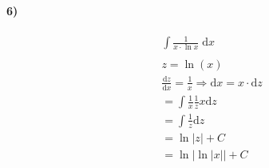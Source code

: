 \paragraph{6)}

\begin{align*}
    &\int \frac{1}{x \cdot \ln x} \;\mathrm{d}x \\
    \\
    &z = \ln (x) \\
    &\frac{\mathrm{d} z}{\mathrm{d} x} = \frac{1}{x} \Rightarrow \mathrm{d} x = x \cdot \mathrm{d} z \\
    &= \int \frac{1}{x} \frac{1}{z} x \mathrm{d}z \\
    &= \int \frac{1}{z} \mathrm{d} z \\
    &= \ln|z| + C \\
    &= \ln|\ln|x|| + C
\end{align*}
